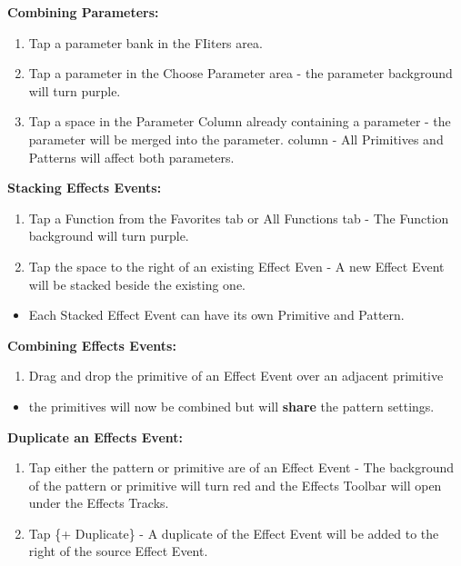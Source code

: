\documentclass[
]{article}
\providecommand{\tightlist}{%
  \setlength{\itemsep}{0pt}\setlength{\parskip}{0pt}}
\begin{document}
\textbf{Combining Parameters:}

\begin{enumerate}
\def\labelenumi{\arabic{enumi}.}
\item
  Tap a parameter bank in the FIiters area.
\item
  Tap a parameter in the Choose Parameter area - the parameter background will turn purple.
\item
  Tap a space in the Parameter Column already containing a parameter - the parameter will be merged into the parameter. column - All Primitives and Patterns will affect both parameters.
\end{enumerate}

\textbf{Stacking Effects Events:}

\begin{enumerate}
\def\labelenumi{\arabic{enumi}.}
\item
  Tap a Function from the Favorites tab or All Functions tab - The Function background will turn purple.
\item
  Tap the space to the right of an existing Effect Even - A new Effect Event will be stacked beside the existing one.
\end{enumerate}

\begin{itemize}
\tightlist
\item
  Each Stacked Effect Event can have its own Primitive and Pattern.
\end{itemize}

\textbf{Combining Effects Events:}

\begin{enumerate}
\def\labelenumi{\arabic{enumi}.}
\tightlist
\item
  Drag and drop the primitive of an Effect Event over an adjacent primitive
\end{enumerate}

\begin{itemize}
\tightlist
\item
  the primitives will now be combined but will \textbf{share} the pattern settings.
\end{itemize}

\textbf{Duplicate an Effects Event:}

\begin{enumerate}
\def\labelenumi{\arabic{enumi}.}
\item
  Tap either the pattern or primitive are of an Effect Event - The background of the pattern or primitive will turn red and the Effects Toolbar will open under the Effects Tracks.
\item
  Tap \{+ Duplicate\} - A duplicate of the Effect Event will be added to the right of the source Effect Event.
\end{enumerate}
\end{document}
